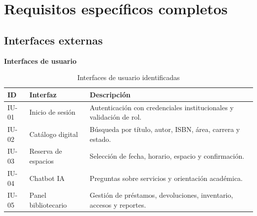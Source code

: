\documentclass[12pt,journal,onecolumn]{IEEEtran}
\begin{document}
\section{Requisitos específicos completos}
\subsection{Interfaces externas}
\medskip\noindent\textbf{Interfaces de usuario}\par\smallskip
\begin{table}[H]\centering
\caption{Interfaces de usuario identificadas}
\begin{tabularx}{\textwidth}{P{0.12\textwidth}P{0.25\textwidth}Y}\toprule
\textbf{ID} & \textbf{Interfaz} & \textbf{Descripción}\\\midrule
IU-01 & Inicio de sesión & Autenticación con credenciales institucionales y validación de rol.\\
IU-02 & Catálogo digital & Búsqueda por título, autor, ISBN, área, carrera y estado.\\
IU-03 & Reserva de espacios & Selección de fecha, horario, espacio y confirmación.\\
IU-04 & Chatbot IA & Preguntas sobre servicios y orientación académica.\\
IU-05 & Panel bibliotecario & Gestión de préstamos, devoluciones, inventario, accesos y reportes.\\\bottomrule
\end{tabularx}
\end{table}
\end{document}
